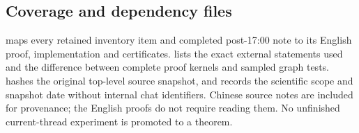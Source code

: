 \subsection{Coverage and dependency files}

 maps every retained inventory item and completed
post-17:00 note to its English proof, implementation and certificates.
 lists the exact external statements used
and the difference between complete proof kernels and sampled graph
tests.  hashes the original
top-level source snapshot, and 
records the scientific scope and snapshot date without internal chat
identifiers. Chinese source notes are
included for provenance; the English proofs do not require reading
them. No unfinished current-thread experiment is promoted to a theorem.
